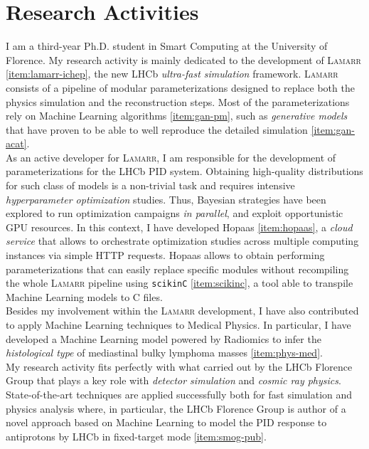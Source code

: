 \section*{Research Activities}
\begin{cvcontent}
  I am a third-year Ph.D. student in Smart Computing at the 
  University of Florence. My research activity is mainly 
  dedicated to the development of \textsc{Lamarr} 
  \ref{item:lamarr-ichep}, the new LHCb \emph{ultra-fast 
  simulation} framework. \textsc{Lamarr} consists of a 
  pipeline of modular parameterizations designed to replace
  both the physics simulation and the reconstruction steps.
  Most of the parameterizations rely on Machine Learning 
  algorithms \ref{item:gan-pm}, such as \emph{generative
  models} that have proven to be able to well reproduce 
  the detailed simulation \ref{item:gan-acat}.
  \\
  As an active developer for \textsc{Lamarr}, I am responsible 
  for the development of parameterizations for the LHCb 
  PID system. Obtaining high-quality distributions for 
  such class of models is a non-trivial task and requires 
  intensive \emph{hyperparameter optimization} studies.
  Thus, Bayesian strategies have been explored to run
  optimization campaigns \emph{in parallel}, and exploit
  opportunistic GPU resources. In this context, I have
  developed Hopaas \ref{item:hopaas}, a \emph{cloud service}
  that allows to orchestrate optimization studies across 
  multiple computing instances via simple HTTP requests.
  Hopaas allows to obtain performing parameterizations
  that can easily replace specific modules without 
  recompiling the whole \textsc{Lamarr} pipeline using 
  \texttt{scikinC} \ref{item:scikinc}, a tool able to
  transpile Machine Learning models to C files.
  \\
  Besides my involvement within the \textsc{Lamarr}
  development, I have also contributed to apply Machine 
  Learning techniques to Medical Physics. In particular,
  I have developed a Machine Learning model powered by
  Radiomics to infer the \emph{histological type} of 
  mediastinal bulky lymphoma masses \ref{item:phys-med}.
  \\
  My research activity fits perfectly with what carried
  out by the LHCb Florence Group that plays a key role
  with \emph{detector simulation} and \emph{cosmic ray 
  physics}. State-of-the-art techniques are applied 
  successfully both for fast simulation and physics 
  analysis where, in particular, the LHCb Florence Group
  is author of a novel approach based on Machine Learning 
  to model the PID response to antiprotons by LHCb in
  fixed-target mode \ref{item:smog-pub}.
\end{cvcontent}